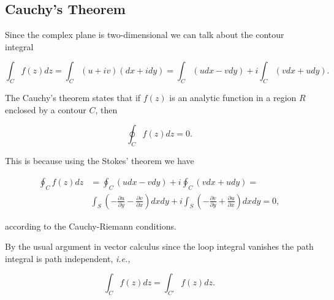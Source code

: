 \documentclass[english,a4paper,12pt]{report}
\begin{document}
\subsection{Cauchy's Theorem}

Since the complex plane is two-dimensional we can talk about the contour integral 

\begin{equation}
    \int_{C}^{} f(z) dz = \int_{C}^{} (u+iv)(dx+idy) = \int_{C}^{} (udx-vdy) + i\int_{C}^{} (vdx+udy).   
\end{equation}

The Cauchy's theorem states that if \(f(z)\) is an analytic function in a region \(R\) enclosed by a contour \(C\), then 

\begin{equation}
    \oint_{C} f(z)dz = 0. \label{cau} 
\end{equation}

This is because using the Stokes' theorem we have 

\begin{equation}
    \begin{aligned} 
    \oint_{C}f(z) dz &= \oint_{C} (udx-vdy) + i \oint_{C} (vdx+udy) =\\
    & \int_{S}^{} \left( -\frac{\partial u}{\partial y} - \frac{\partial v}{\partial x}  \right) dxdy + i \int_{S}^{} \left( -\frac{\partial v}{\partial y} + \frac{\partial u}{\partial x}   \right)  dxdy = 0,
    \end{aligned} 
\end{equation}

according to the Cauchy-Riemann conditions.

By the usual argument in vector calculus since the loop integral vanishes the path integral is path independent, \textit{i.e.,} 

\begin{equation}
    \int_{C}^{} f(z)dz = \int_{C'}^{} f(z)dz.  
\end{equation}
\end{document}
